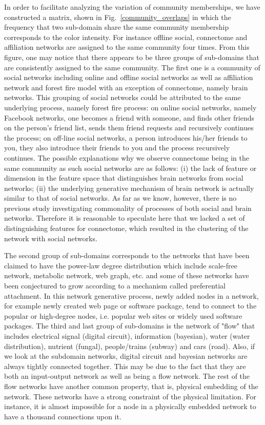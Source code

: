 In order to facilitate analyzing the variation of community memberships, we have constructed a matrix, shown in Fig.~\ref{community_overlaps} in which the frequency that two sub-domain share the same community membership corresponds to the color intensity. For instance offline social, connectome and affiliation networks are assigned to the same community four times. From this figure, one may notice that there appears to be three groups of sub-domains that are consistently assigned to the same community. The first one is a community of social networks including online and offline social networks as well as affiliation network and forest fire model with an exception of connectome, namely brain networks. This grouping of social networks could be attributed to the same underlying process, namely forest fire process: on online social networks, namely Facebook networks, one becomes a friend with someone, and finds other friends on the person's friend list, sends them friend requests and recursively continues the process; on off-line social networks, a person introduces his/her friends to you, they also introduce their friends to you and the process recursively continues. The possible explanations why we observe connectome being in the same community as such social networks are as follows: (i) the lack of feature or dimension in the feature space that distinguishes brain networks from social networks; (ii) the underlying generative mechanism of brain network is actually similar to that of social networks. As far as we know, however, there is no previous study investigating commonality of processes of both social and brain networks. Therefore it is reasonable to speculate here that we lacked a set of distinguishing features for connectome, which resulted in the clustering of the network with social networks.

The second group of sub-domains corresponds to the networks that have been claimed to have the power-law degree distribution which include scale-free network, metabolic network, web graph, etc. and some of these networks have been conjectured to grow according to a mechanism called preferential attachment. In this network generative process, newly added nodes in a network, for example newly created web page or software package, tend to connect to the popular or high-degree nodes, i.e. popular web sites or widely used software packages. The third and last group of sub-domains is the network of "flow" that includes electrical signal (digital circuit), information (bayesian), water (water distribution), nutrient (fungal), people/trains (subway) and cars (road).  Also, if we look at the subdomain networks, digital circuit and bayesian networks are always tightly connected together. This may be due to the fact that they are both an input-output network as well as being a flow network. The rest of the flow networks have another common property, that is, physical embedding of the network. These networks have a strong constraint of the physical limitation. For instance, it is almost impossible for a node in a physically embedded network to have a thousand connections upon it.

